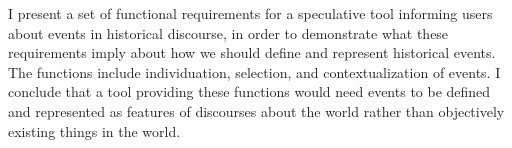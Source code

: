 I present a set of functional requirements for a speculative tool informing users about events in historical discourse, in order to demonstrate what these
 requirements imply about how we should define and represent historical events.
 The functions include individuation, selection, and contextualization of
 events. I conclude that a tool providing these functions would need events to
 be defined and represented as features of discourses about the world rather
 than objectively existing things in the world.

